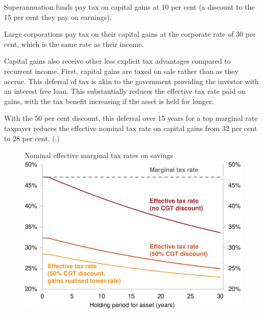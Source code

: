 Superannuation funds pay tax on capital gains at 10 per cent (a discount to the 15 per cent they pay on earnings). 

Large corporations pay tax on their capital gains at the corporate rate of 30 per cent, which is the same rate as their income.

Capital gains also receive other less explicit tax advantages compared to recurrent income. First, capital gains are taxed on sale rather than as they accrue. This deferral of tax is akin to the government providing the investor with an interest free loan.  This substantially reduces the effective tax rate paid on gains, with the tax benefit increasing if the asset is held for longer.


With the 50 per cent discount, this deferral over 15 years for a top marginal rate taxpayer reduces the effective nominal tax rate on capital gains from 32 per cent to 28 per cent. (.)

\begin{figure}
%
{Nominal effective marginal tax rates on savings}\label{fig:CG-marginal-tax-rates-delayed}
\includegraphics[width=\columnwidth]{CGT-NG-atlas/CG-marginal-tax-rates-delayed.pdf}

\end{figure}


